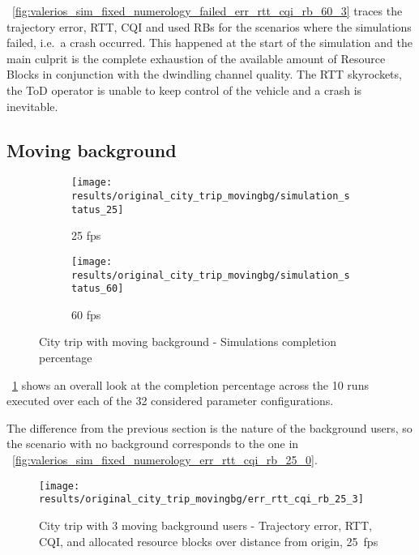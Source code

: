 \figurename~\ref{fig:valerios_sim_fixed_numerology_failed_err_rtt_cqi_rb_60_3} traces the trajectory error, RTT, CQI and used RBs for the scenarios where the simulations failed, i.e.\ a crash occurred. This happened at the start of the simulation and the main culprit is the complete exhaustion of the available amount of Resource Blocks in conjunction with the dwindling channel quality. The RTT skyrockets, the ToD operator is unable to keep control of the vehicle and a crash is inevitable.



\subsection{Moving background}
\begin{figure}[H]
    \centering
    \begin{subfigure}[b]{0.95\textwidth}
        \centering
        \texttt{[image: results/original\_city\_trip\_movingbg/simulation\_status\_25]}
        \caption{25 fps}
    \end{subfigure}
    \hfill
    \begin{subfigure}[b]{0.95\textwidth}
        \centering
        \texttt{[image: results/original\_city\_trip\_movingbg/simulation\_status\_60]}
        \caption{60 fps}
    \end{subfigure}
    \caption{City trip with moving background - Simulations completion percentage}
    \label{fig:original_city_trip_movingbg_completion_percentage}
\end{figure}

\figurename~\ref{fig:original_city_trip_movingbg_completion_percentage} shows an overall look at the completion percentage across the 10 runs executed over each of the 32 considered parameter configurations.

The difference from the previous section is the nature of the background users, so the scenario with no background corresponds to the one in \figurename~\ref{fig:valerios_sim_fixed_numerology_err_rtt_cqi_rb_25_0}.

\begin{figure}[H]
    \centering
    \texttt{[image: results/original\_city\_trip\_movingbg/err\_rtt\_cqi\_rb\_25\_3]}
    \caption{City trip with 3 moving background users - Trajectory error, RTT, CQI, and allocated resource blocks over distance from origin, 25~fps}
    \label{fig:original_city_trip_movingbg_err_rtt_cqi_rb_25_3}
\end{figure}

